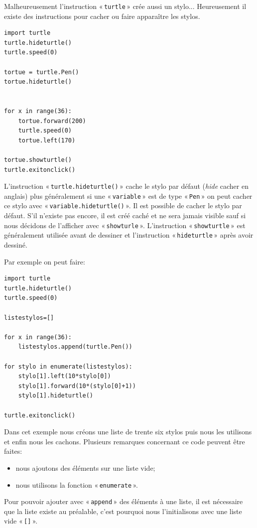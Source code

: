 Malheureusement l'instruction « \texttt{turtle} » crée aussi un stylo... Heureusement il existe des instructions pour cacher ou faire apparaître les stylos.

\begin{Verbatim}[frame=single,rulecolor=\color{mbleu}, label=à taper]
import turtle
turtle.hideturtle()
turtle.speed(0)

tortue = turtle.Pen()
tortue.hideturtle()


for x in range(36):
    tortue.forward(200)
    turtle.speed(0)
    tortue.left(170)

tortue.showturtle()    
turtle.exitonclick()
\end{Verbatim}

L'instruction « \texttt{turtle.hideturtle()} » cache le stylo par défaut (\emph{hide} cacher en anglais) plus généralement si une « \texttt{variable} »  est de type « \texttt{Pen} » on peut cacher ce stylo avec « \texttt{variable.hideturtle()} ». Il est possible de cacher le stylo par défaut. S'il n'existe pas encore, il est créé caché et ne sera jamais visible sauf si nous décidons de l'afficher avec « \texttt{showturle} ». L'instruction  « \texttt{showturtle} » est généralement utilisée avant de dessiner et l'instruction « \texttt{hideturtle} » après avoir dessiné.

Par exemple on peut faire:
\begin{Verbatim}[frame=single,rulecolor=\color{mbleu}, label=à taper]
import turtle
turtle.hideturtle()
turtle.speed(0)

listestylos=[]

for x in range(36):
    listestylos.append(turtle.Pen())
    
for stylo in enumerate(listestylos): 
    stylo[1].left(10*stylo[0])
    stylo[1].forward(10*(stylo[0]+1))
    stylo[1].hideturtle()

turtle.exitonclick()
\end{Verbatim}

Dans cet exemple nous créons une liste de trente six stylos puis nous les utilisons et enfin nous les cachons.
Plusieurs remarques concernant ce code peuvent être faites:
\begin{itemize}
\item nous ajoutons des éléments sur une liste vide;
\item nous utilisons la fonction « \texttt{enumerate} ».
\end{itemize}

Pour pouvoir ajouter avec « \texttt{append} » des éléments à une liste, il est nécessaire que la liste existe au préalable, c'est pourquoi nous l'initialisons avec une liste vide « \texttt{[]} ».

